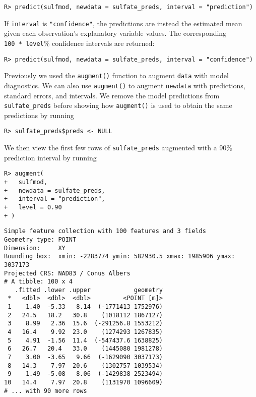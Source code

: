 \documentclass[10pt,letterpaper]{article}
\begin{document}
\begin{verbatim}
R> predict(sulfmod, newdata = sulfate_preds, interval = "prediction")
\end{verbatim}

If \texttt{interval} is \texttt{"confidence"}, the predictions are
instead the estimated mean given each observation's explanatory variable
values. The corresponding \texttt{100\ *\ level}\% confidence intervals
are returned:

\begin{verbatim}
R> predict(sulfmod, newdata = sulfate_preds, interval = "confidence")
\end{verbatim}

Previously we used the \texttt{augment()} function to augment
\texttt{data} with model diagnostics. We can also use \texttt{augment()}
to augment \texttt{newdata} with predictions, standard errors, and
intervals. We remove the model predictions from \texttt{sulfate\_preds}
before showing how \texttt{augment()} is used to obtain the same
predictions by running

\begin{verbatim}
R> sulfate_preds$preds <- NULL
\end{verbatim}

We then view the first few rows of \texttt{sulfate\_preds} augmented
with a 90\% prediction interval by running

\begin{verbatim}
R> augment(
+   sulfmod,
+   newdata = sulfate_preds,
+   interval = "prediction",
+   level = 0.90
+ )
\end{verbatim}

\begin{verbatim}
Simple feature collection with 100 features and 3 fields
Geometry type: POINT
Dimension:     XY
Bounding box:  xmin: -2283774 ymin: 582930.5 xmax: 1985906 ymax: 3037173
Projected CRS: NAD83 / Conus Albers
# A tibble: 100 x 4
   .fitted .lower .upper            geometry
 *   <dbl>  <dbl>  <dbl>         <POINT [m]>
 1    1.40  -5.33   8.14  (-1771413 1752976)
 2   24.5   18.2   30.8    (1018112 1867127)
 3    8.99   2.36  15.6  (-291256.8 1553212)
 4   16.4    9.92  23.0    (1274293 1267835)
 5    4.91  -1.56  11.4  (-547437.6 1638825)
 6   26.7   20.4   33.0    (1445080 1981278)
 7    3.00  -3.65   9.66  (-1629090 3037173)
 8   14.3    7.97  20.6    (1302757 1039534)
 9    1.49  -5.08   8.06  (-1429838 2523494)
10   14.4    7.97  20.8    (1131970 1096609)
# ... with 90 more rows
\end{verbatim}
\end{document}
